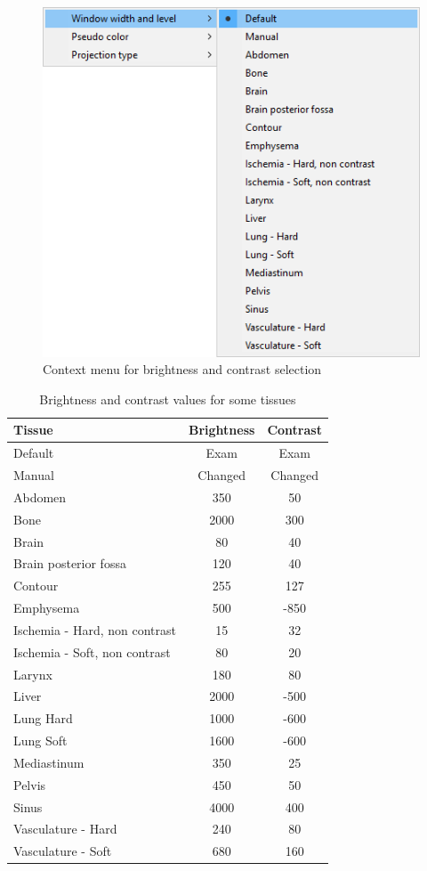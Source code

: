 \begin{figure}[!htb]
\centering
\includegraphics[scale=0.40]{../user_guide_figures/invesalius_screen/menu_window_and_level_en.png}
\caption{Context menu for brightness and contrast selection}
\label{fig:window_level}
\end{figure}

\begin{table}[!h]
\centering
\caption{Brightness and contrast values for some tissues}
\begin{tabular}{lcc}\\
\hline %
Tissue & Brightness & Contrast\\
\hline
\hline
Default & Exam & Exam\\
Manual & Changed & Changed\\
Abdomen & 350 & 50\\
Bone & 2000 & 300\\
Brain & 80 & 40\\
Brain posterior fossa & 120 & 40\\
Contour & 255 & 127\\
Emphysema & 500 & -850\\
Ischemia - Hard, non contrast & 15 & 32\\
Ischemia - Soft, non contrast & 80 & 20\\
Larynx & 180 & 80\\
Liver & 2000 & -500\\
Lung Hard & 1000 & -600\\
Lung Soft & 1600 & -600\\
Mediastinum & 350 & 25\\
Pelvis & 450 & 50\\
Sinus & 4000 & 400\\
Vasculature - Hard & 240 & 80\\
Vasculature - Soft & 680 & 160\\
\hline
\end{tabular}
\label{tab:window_level}
\end{table} 

